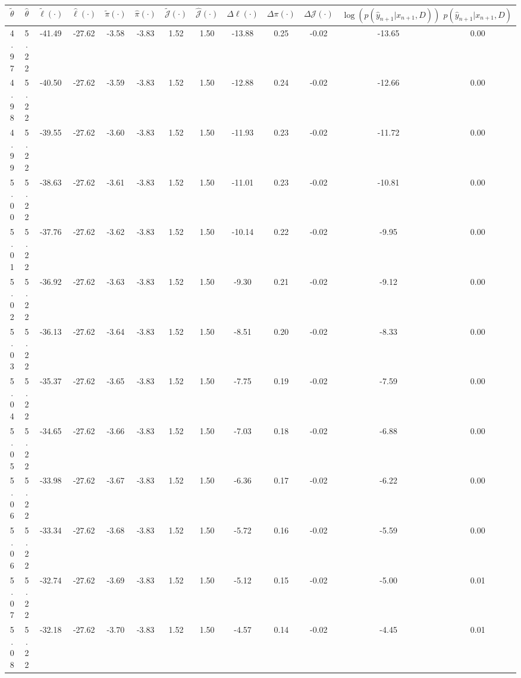 \begin{table}[htbp]
        \centering
        \tiny
        \begin{adjustbox}{angle=90}
            \begin{tabular}{|c|c|c|c|c|c|c|c|c|c|c|c|c|}
                \hline
                 $\tilde{\theta}$ & $\hat{\theta}$ & $\tilde{\ell}(\cdot)$ & $\hat{\ell}(\cdot)$ & $\tilde{\pi}(\cdot)$ & $\hat{\pi}(\cdot)$ & $\tilde{\mathcal{J}}(\cdot)$ & $\hat{\mathcal{J}}(\cdot)$ & $\Delta \ell(\cdot)$ & $\Delta \pi(\cdot)$ & $\Delta \mathcal{J}(\cdot)$ & $\log(p(\hat{y}_{n+1}|x_{n+1}, D))$ & $p(\hat{y}_{n+1}|x_{n+1}, D)$ \\
                \hline
                 4.97 & 5.22 & -41.49 & -27.62 & -3.58 & -3.83 & 1.52 & 1.50 & -13.88 & 0.25 & -0.02 & -13.65 & 0.00\\ \hline
 4.98 & 5.22 & -40.50 & -27.62 & -3.59 & -3.83 & 1.52 & 1.50 & -12.88 & 0.24 & -0.02 & -12.66 & 0.00\\ \hline
 4.99 & 5.22 & -39.55 & -27.62 & -3.60 & -3.83 & 1.52 & 1.50 & -11.93 & 0.23 & -0.02 & -11.72 & 0.00\\ \hline
 5.00 & 5.22 & -38.63 & -27.62 & -3.61 & -3.83 & 1.52 & 1.50 & -11.01 & 0.23 & -0.02 & -10.81 & 0.00\\ \hline
 5.01 & 5.22 & -37.76 & -27.62 & -3.62 & -3.83 & 1.52 & 1.50 & -10.14 & 0.22 & -0.02 & -9.95 & 0.00\\ \hline
 5.02 & 5.22 & -36.92 & -27.62 & -3.63 & -3.83 & 1.52 & 1.50 & -9.30 & 0.21 & -0.02 & -9.12 & 0.00\\ \hline
 5.03 & 5.22 & -36.13 & -27.62 & -3.64 & -3.83 & 1.52 & 1.50 & -8.51 & 0.20 & -0.02 & -8.33 & 0.00\\ \hline
 5.04 & 5.22 & -35.37 & -27.62 & -3.65 & -3.83 & 1.52 & 1.50 & -7.75 & 0.19 & -0.02 & -7.59 & 0.00\\ \hline
 5.05 & 5.22 & -34.65 & -27.62 & -3.66 & -3.83 & 1.52 & 1.50 & -7.03 & 0.18 & -0.02 & -6.88 & 0.00\\ \hline
 5.06 & 5.22 & -33.98 & -27.62 & -3.67 & -3.83 & 1.52 & 1.50 & -6.36 & 0.17 & -0.02 & -6.22 & 0.00\\ \hline
 5.06 & 5.22 & -33.34 & -27.62 & -3.68 & -3.83 & 1.52 & 1.50 & -5.72 & 0.16 & -0.02 & -5.59 & 0.00\\ \hline
 5.07 & 5.22 & -32.74 & -27.62 & -3.69 & -3.83 & 1.52 & 1.50 & -5.12 & 0.15 & -0.02 & -5.00 & 0.01\\ \hline
 5.08 & 5.22 & -32.18 & -27.62 & -3.70 & -3.83 & 1.52 & 1.50 & -4.57 & 0.14 & -0.02 & -4.45 & 0.01\\ \hline

\end{tabular}
\end{adjustbox}
\end{table}
